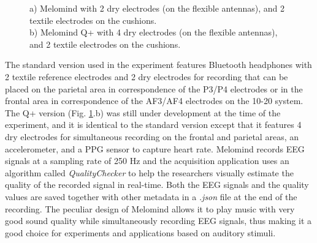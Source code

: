  \begin{figure}[!h]
    \centering
{}%
\hfil
{}%
    \caption{a) Melomind with 2 dry electrodes (on the flexible antennas), and 2 textile electrodes on the cushions.  \\ b) Melomind Q+ with 4 dry electrodes (on the flexible antennas), and 2 textile electrodes on the cushions.}
    \label{fig_melomind}%
    \end{figure}

The standard version used in the experiment features Bluetooth headphones with 2 textile reference electrodes and 2 dry electrodes for recording that can be placed on the parietal area in correspondence of the P3/P4 electrodes or in the frontal area in correspondence of the AF3/AF4 electrodes on the 10-20 system. The Q+ version (Fig. \ref{fig_melomind}.b) was still under development at the time of the experiment, and it is identical to the standard version except that it features 4 dry electrodes for simultaneous recording on the frontal and parietal areas, an accelerometer, and a \ac{PPG} sensor to capture heart rate. Melomind records EEG signals at a sampling rate of 250 Hz and the acquisition application uses an algorithm called \emph{QualityChecker} to help the researchers visually estimate the quality of the recorded signal in real-time. Both the EEG signals and the quality values are saved together with other metadata in a \emph{.json} file at the end of the recording. The peculiar design of Melomind allows it to play music with very good sound quality while simultaneously recording EEG signals, thus making it a good choice for experiments and applications based on auditory stimuli.

